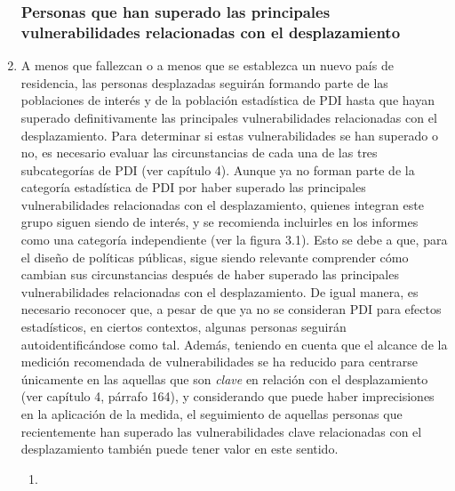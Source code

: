 \documentclass[
]{book}
\begin{document}
\begin{enumerate}
{  \subsubsection{Personas que han superado las principales vulnerabilidades relacionadas con el desplazamiento}\label{personas-que-han-superado-las-principales-vulnerabilidades-relacionadas-con-el-desplazamiento}}
\item
  A menos que fallezcan o a menos que se establezca un nuevo país de residencia, las personas desplazadas seguirán formando parte de las poblaciones de interés y de la población estadística de PDI hasta que hayan superado definitivamente las principales vulnerabilidades relacionadas con el desplazamiento. Para determinar si estas vulnerabilidades se han superado o no, es necesario evaluar las circunstancias de cada una de las tres subcategorías de PDI (ver capítulo 4). Aunque ya no forman parte de la categoría estadística de PDI por haber superado las principales vulnerabilidades relacionadas con el desplazamiento, quienes integran este grupo siguen siendo de interés, y se recomienda incluirles en los informes como una categoría independiente (ver la figura 3.1). Esto se debe a que, para el diseño de políticas públicas, sigue siendo relevante comprender cómo cambian sus circunstancias después de haber superado las principales vulnerabilidades relacionadas con el desplazamiento. De igual manera, es necesario reconocer que, a pesar de que ya no se consideran PDI para efectos estadísticos, en ciertos contextos, algunas personas seguirán autoidentificándose como tal. Además, teniendo en cuenta que el alcance de la medición recomendada de vulnerabilidades se ha reducido para centrarse únicamente en las aquellas que son \emph{clave} en relación con el desplazamiento (ver capítulo 4, párrafo 164), y considerando que puede haber imprecisiones en la aplicación de la medida, el seguimiento de aquellas personas que recientemente han superado las vulnerabilidades clave relacionadas con el desplazamiento también puede tener valor en este sentido.

  \begin{enumerate}
  \def\labelenumii{\arabic{enumii}.}
  \item ~
    \hypertarget{categoruxedas-de-personas-desplazadas-no-incluidas-en-el-marco-estaduxedstico-del-desplazamiento-interno}{%
}
\end{enumerate}
\end{enumerate}
\end{document}
